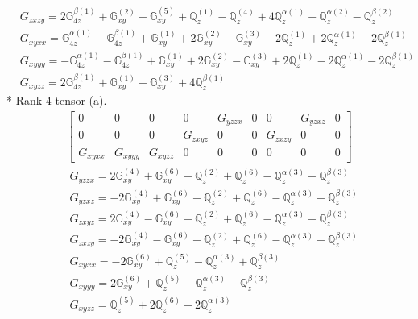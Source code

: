 \documentclass[fleqn,8pt,landscape]{jsarticle}
\begin{document}
\begin{align*}
& G_{zxzy} = 2 \mathbb{G}_{4z}^{\beta(1)} + \mathbb{G}_{xy}^{(2)} - \mathbb{G}_{xy}^{(5)} + \mathbb{Q}_{z}^{(1)} - \mathbb{Q}_{z}^{(4)} + 4 \mathbb{Q}_{z}^{\alpha(1)} + \mathbb{Q}_{z}^{\alpha(2)} - \mathbb{Q}_{z}^{\beta(2)} \\
& G_{xyxx} = \mathbb{G}_{4z}^{\alpha(1)} - \mathbb{G}_{4z}^{\beta(1)} + \mathbb{G}_{xy}^{(1)} + 2 \mathbb{G}_{xy}^{(2)} - \mathbb{G}_{xy}^{(3)} - 2 \mathbb{Q}_{z}^{(1)} + 2 \mathbb{Q}_{z}^{\alpha(1)} - 2 \mathbb{Q}_{z}^{\beta(1)} \\
& G_{xyyy} = - \mathbb{G}_{4z}^{\alpha(1)} - \mathbb{G}_{4z}^{\beta(1)} + \mathbb{G}_{xy}^{(1)} + 2 \mathbb{G}_{xy}^{(2)} - \mathbb{G}_{xy}^{(3)} + 2 \mathbb{Q}_{z}^{(1)} - 2 \mathbb{Q}_{z}^{\alpha(1)} - 2 \mathbb{Q}_{z}^{\beta(1)} \\
& G_{xyzz} = 2 \mathbb{G}_{4z}^{\beta(1)} + \mathbb{G}_{xy}^{(1)} - \mathbb{G}_{xy}^{(3)} + 4 \mathbb{Q}_{z}^{\beta(1)}
\end{align*}
* Rank 4 tensor (a).
\begin{align*}
\begin{bmatrix} 0 & 0 & 0 & 0 & G_{yzzx} & 0 & 0 & G_{yzxz} & 0 \\ 0 & 0 & 0 & G_{zxyz} & 0 & 0 & G_{zxzy} & 0 & 0 \\ G_{xyxx} & G_{xyyy} & G_{xyzz} & 0 & 0 & 0 & 0 & 0 & 0 \end{bmatrix}
\end{align*}
\begin{align*}
& G_{yzzx} = 2 \mathbb{G}_{xy}^{(4)} + \mathbb{G}_{xy}^{(6)} - \mathbb{Q}_{z}^{(2)} + \mathbb{Q}_{z}^{(6)} - \mathbb{Q}_{z}^{\alpha(3)} + \mathbb{Q}_{z}^{\beta(3)} \\
& G_{yzxz} = - 2 \mathbb{G}_{xy}^{(4)} + \mathbb{G}_{xy}^{(6)} + \mathbb{Q}_{z}^{(2)} + \mathbb{Q}_{z}^{(6)} - \mathbb{Q}_{z}^{\alpha(3)} + \mathbb{Q}_{z}^{\beta(3)} \\
& G_{zxyz} = 2 \mathbb{G}_{xy}^{(4)} - \mathbb{G}_{xy}^{(6)} + \mathbb{Q}_{z}^{(2)} + \mathbb{Q}_{z}^{(6)} - \mathbb{Q}_{z}^{\alpha(3)} - \mathbb{Q}_{z}^{\beta(3)} \\
& G_{zxzy} = - 2 \mathbb{G}_{xy}^{(4)} - \mathbb{G}_{xy}^{(6)} - \mathbb{Q}_{z}^{(2)} + \mathbb{Q}_{z}^{(6)} - \mathbb{Q}_{z}^{\alpha(3)} - \mathbb{Q}_{z}^{\beta(3)} \\
& G_{xyxx} = - 2 \mathbb{G}_{xy}^{(6)} + \mathbb{Q}_{z}^{(5)} - \mathbb{Q}_{z}^{\alpha(3)} + \mathbb{Q}_{z}^{\beta(3)} \\
& G_{xyyy} = 2 \mathbb{G}_{xy}^{(6)} + \mathbb{Q}_{z}^{(5)} - \mathbb{Q}_{z}^{\alpha(3)} - \mathbb{Q}_{z}^{\beta(3)} \\
& G_{xyzz} = \mathbb{Q}_{z}^{(5)} + 2 \mathbb{Q}_{z}^{(6)} + 2 \mathbb{Q}_{z}^{\alpha(3)}
\end{align*}
\end{document}

